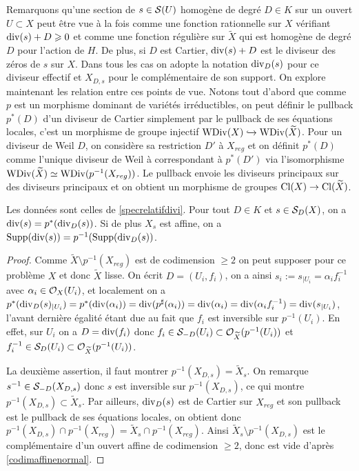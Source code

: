 Remarquons qu'une section de $s\in \mathcal{S}(U)$ homogène de degré $D\in K$ sur un ouvert $U\subset X$ peut être vue à la fois comme une fonction rationnelle sur $X$ vérifiant $\operatorname{div}(s)+D\geqslant 0$ et comme une fonction régulière sur $\widetilde{X}$ qui est homogène de degré $D$ pour l'action de $H$. De plus, si $D$ est Cartier, $\operatorname{div}(s)+D$ est le diviseur des zéros de $s$ sur $X$. Dans tous les cas on adopte la notation $\operatorname{div}_D(s)$ pour ce diviseur effectif et $X_{D,s}$ pour le complémentaire de son support. On explore maintenant les relation entre ces points de vue. Notons tout d'abord que comme $p$ est un morphisme dominant de variétés irréductibles, on peut définir le pullback $p^*(D)$ d'un diviseur de Cartier simplement par le pullback de ses équations locales, c'est un morphisme de groupe injectif $\operatorname{WDiv}(X)\xhookrightarrow{}\operatorname{WDiv}(\widetilde{X})$. Pour un diviseur de Weil $D$, on considère sa restriction $D'$ à $X_{reg}$ et on définit $p^*(D)$ comme l'unique diviseur de Weil à correspondant à $p^*(D')$ via l'isomorphisme $\operatorname{WDiv}(\widetilde{X})\simeq\operatorname{WDiv}(p^{-1}(X_{reg}))$. Le pullback envoie les diviseurs principaux sur des diviseurs principaux et on obtient un morphisme de groupes $\operatorname{Cl}(X)\rightarrow \operatorname{Cl}(\widetilde{X})$.

\begin{prop}\label{pstarprincipal}
Les données sont celles de \ref{specrelatifdivi}. Pour tout $D\in K$ et $s\in\mathcal{S}_D(X)$, on a $\operatorname{div}(s)=p^*(\operatorname{div}_D(s))$. Si de plus $X_s$ est affine, on a $\operatorname{Supp}(\operatorname{div}(s))=p^{-1}(\operatorname{Supp}(\operatorname{div}_D(s))$.
\end{prop}
\begin{proof}
Comme $\widetilde{X}\setminus p^{-1}(X_{reg})$ est de codimension $\geq 2$ on peut supposer pour ce problème $X$ et donc $\widetilde{X}$ lisse. On écrit $D=(U_i, f_i)$, on a ainsi $s_i:=s_{|U_i}=\alpha_i f_i^{-1}$ avec $\alpha_i\in \mathcal{O}_X(U_i)$, et localement on a $p^*(\operatorname{div}_D(s)_{|U_i})=p^*(\operatorname{div}(\alpha_i))=\operatorname{div}(p^\sharp(\alpha_i))=\operatorname{div}(\alpha_i)=\operatorname{div}(\alpha_i f_i^{-1})=\operatorname{div}(s_{|U_i})$, l'avant dernière égalité étant due au fait que $f_i$ est inversible sur $p^{-1}(U_i)$. En effet, sur $U_i$ on a $D=\operatorname{div}(f_i)$ donc $f_i\in \mathcal{S}_{-D}(U_i)\subset\mathcal{O}_{\widetilde{X}}(p^{-1}(U_i))$ et $f_i^{-1}\in \mathcal{S}_D(U_i)\subset\mathcal{O}_{\widetilde{X}}(p^{-1}(U_i))$.

La deuxième assertion, il faut montrer $p^{-1}(X_{D,s})=\widetilde{X}_s$. On remarque $s^{-1}\in \mathcal{S}_{-D}(X_{D,s})$ donc $s$ est inversible sur $p^{-1}(X_{D,s})$, ce qui montre $p^{-1}(X_{D,s})\subset \widetilde{X}_s$. Par ailleurs, $\operatorname{div}_D(s)$ est de Cartier sur $X_{reg}$ et son pullback est le pullback de ses équations locales, on obtient donc $p^{-1}(X_{D,s})\cap p^{-1}(X_{reg})=\widetilde{X}_s \cap p^{-1}(X_{reg})$. Ainsi $\widetilde{X}_s \setminus p^{-1}(X_{D,s})$ est le complémentaire d'un ouvert affine de codimension $\geq 2$, donc est vide d'après \ref{codimaffinenormal}.
\end{proof}

